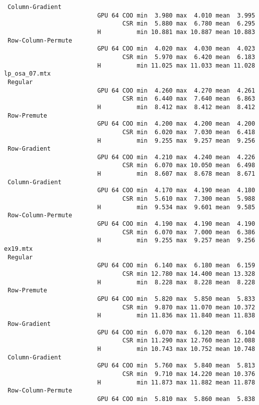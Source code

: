 {\begin{verbatim}
 Column-Gradient
                          GPU 64 COO min  3.980 max  4.010 mean  3.995
                                 CSR min  5.880 max  6.780 mean  6.295
                          H          min 10.881 max 10.887 mean 10.883
 Row-Column-Permute
                          GPU 64 COO min  4.020 max  4.030 mean  4.023
                                 CSR min  5.970 max  6.420 mean  6.183
                          H          min 11.025 max 11.033 mean 11.028
lp_osa_07.mtx
 Regular
                          GPU 64 COO min  4.260 max  4.270 mean  4.261
                                 CSR min  6.440 max  7.640 mean  6.863
                          H          min  8.412 max  8.412 mean  8.412
 Row-Premute
                          GPU 64 COO min  4.200 max  4.200 mean  4.200
                                 CSR min  6.020 max  7.030 mean  6.418
                          H          min  9.255 max  9.257 mean  9.256
 Row-Gradient
                          GPU 64 COO min  4.210 max  4.240 mean  4.226
                                 CSR min  6.070 max 10.050 mean  6.498
                          H          min  8.607 max  8.678 mean  8.671
 Column-Gradient
                          GPU 64 COO min  4.170 max  4.190 mean  4.180
                                 CSR min  5.610 max  7.300 mean  5.988
                          H          min  9.534 max  9.601 mean  9.585
 Row-Column-Permute
                          GPU 64 COO min  4.190 max  4.190 mean  4.190
                                 CSR min  6.070 max  7.000 mean  6.386
                          H          min  9.255 max  9.257 mean  9.256
ex19.mtx
 Regular
                          GPU 64 COO min  6.140 max  6.180 mean  6.159
                                 CSR min 12.780 max 14.400 mean 13.328
                          H          min  8.228 max  8.228 mean  8.228
 Row-Premute
                          GPU 64 COO min  5.820 max  5.850 mean  5.833
                                 CSR min  9.870 max 11.070 mean 10.372
                          H          min 11.836 max 11.840 mean 11.838
 Row-Gradient
                          GPU 64 COO min  6.070 max  6.120 mean  6.104
                                 CSR min 11.290 max 12.760 mean 12.088
                          H          min 10.743 max 10.752 mean 10.748
 Column-Gradient
                          GPU 64 COO min  5.760 max  5.840 mean  5.813
                                 CSR min  9.710 max 14.220 mean 10.376
                          H          min 11.873 max 11.882 mean 11.878
 Row-Column-Permute
                          GPU 64 COO min  5.810 max  5.860 mean  5.838

\end{verbatim}}
